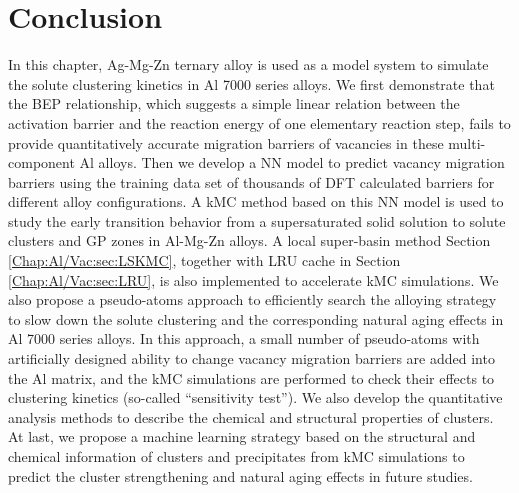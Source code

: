 \section{Conclusion}
\label{Chap:Al/Vac:section:Conc}


In this chapter, Ag-Mg-Zn ternary alloy is used as a model system to simulate the solute clustering kinetics in Al 7000 series alloys. We first demonstrate that the \acf{BEP} relationship, which suggests a simple linear relation between the activation barrier and the reaction energy of one elementary reaction step, fails to provide quantitatively accurate migration barriers of vacancies in these multi-component Al alloys. Then we develop a \ac{NN} model to predict vacancy migration barriers using the training data set of thousands of \ac{DFT} calculated barriers for different alloy configurations. A \ac{kMC} method based on this \ac{NN} model is used to study the early transition behavior from a supersaturated solid solution to solute clusters and \acf{GP} zones in Al-Mg-Zn alloys. A local super-basin method  Section \ref{Chap:Al/Vac:sec:LSKMC}, together with \ac{LRU} cache in Section \ref{Chap:Al/Vac:sec:LRU}, is also implemented to accelerate \ac{kMC} simulations. We also propose a pseudo-atoms approach to efficiently search the alloying strategy to slow down the solute clustering and the corresponding natural aging effects in Al 7000 series alloys. In this approach, a small number of pseudo-atoms with artificially designed ability to change vacancy migration barriers are added into the Al matrix, and the \ac{kMC} simulations are performed to check their effects to clustering kinetics (so-called ``sensitivity test''). We also develop the quantitative analysis methods to describe the chemical and structural properties of clusters. At last, we propose a machine learning strategy based on the structural and chemical information of clusters and precipitates from \ac{kMC} simulations to predict the cluster strengthening and natural aging effects in future studies.
